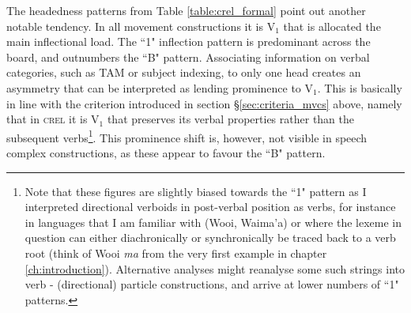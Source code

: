 The headedness patterns from Table \ref{table:crel_formal} point out another notable tendency. In all movement constructions it is V$_1$ that is allocated the main inflectional load. The ``1" inflection pattern is predominant across the board, and outnumbers the ``B" pattern. Associating information on verbal categories, such as TAM or subject indexing, to only one head creates an asymmetry that can be interpreted as lending prominence to V$_1$. This is basically in line with the criterion introduced in section §\ref{sec:criteria_mvcs} above, namely that in \textsc{crel} it is V$_1$ that preserves its verbal properties rather than the subsequent verbs\footnote{Note that these figures are slightly biased towards the ``1" pattern as I interpreted directional verboids in post-verbal position as verbs, for instance in languages that I am familiar with (Wooi, Waima'a) or where the lexeme in question can either diachronically or synchronically be traced back to a verb root (think of Wooi \textit{ma} from the very first example in chapter \ref{ch:introduction}). Alternative analyses might reanalyse some such strings into verb - (directional) particle constructions, and arrive at lower numbers of ``1" patterns.}. This prominence shift is, however, not visible in speech complex constructions, as these appear to favour the ``B" pattern.

